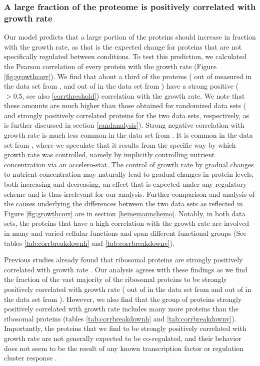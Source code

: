 \subsubsection{A large fraction of the proteome is positively correlated with growth rate}
Our model predicts that a large portion of the proteins should increase in fraction with the growth rate, as that is the expected change for proteins that are not specifically regulated between conditions.
To test this prediction, we calculated the Pearson correlation of every protein with the growth rate (Figure \ref{fig:growthcorr}).
We find that about a third of the proteins (\hGlobal{} out of \hTotal{} measured in the data set from \cite{Heinemann2015}, and \vGlobal{} out of \vTotal{} in the data set from \cite{Peebo_2015}) have a strong positive ($>0.5$, see also \ref{corrthreshold}) correlation with the growth rate.
We note that these amounts are much higher than those obtained for randomized data sets (\hGlobalShuff{} and \vGlobalShuff{} strongly positively correlated proteins for the two data sets, respectively, as is further discussed in section \ref{randanalysis}).
Strong negative correlation with growth rate is much less common in the data set from \cite{Heinemann2015}.
It is common in the data set from \cite{Peebo_2015}, where we speculate that it results from the specific way by which growth rate was controlled, namely by implicitly controlling nutrient concentration via an accelero-stat.
The control of growth rate by gradual changes to nutrient concentration may naturally lead to gradual changes in protein levels, both increasing and decreasing, an effect that is expected under any regulatory scheme and is thus irrelevant for our analysis. 
Further comparison and analysis of the causes underlying the differences between the two data sets as reflected in Figure \ref{fig:growthcorr} are in section \ref{heinemannchemo}.
Notably, in both data sets, the proteins that have a high correlation with the growth rate are involved in many and varied cellular functions and span different functional groups (See tables \ref{tab:corrbreakdownh} and \ref{tab:corrbreakdownv}).

Previous studies already found that ribosomal proteins are strongly positively correlated with growth rate \cite{Pedersen1978a, ingraham1983growth, Klumpp2008}.
Our analysis agrees with these findings as we find the fraction of the vast majority of the ribosomal proteins to be strongly positively correlated with growth rate (\hCorrRibs{} out of \hRibs{} in the data set from \cite{Heinemann2015} and \vCorrRibs{} out of \vRibs{} in the data set from \cite{Peebo_2015}).
However, we also find that the group of proteins strongly positively correlated with growth rate includes many more proteins than the ribosomal proteins (tables \ref{tab:corrbreakdownh} and \ref{tab:corrbreakdownv}).
Importantly, the proteins that we find to be strongly positively correlated with growth rate are not generally expected to be co-regulated, and their behavior does not seem to be the result of any known transcription factor or regulation cluster response \cite{23203884}.